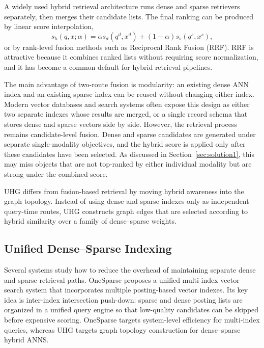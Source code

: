 A widely used hybrid retrieval architecture runs dense and sparse retrievers separately, then merges their candidate lists. The final ranking can be produced by linear score interpolation,
\begin{equation}
    s_h(q,x;\alpha)=\alpha s_d(q^d,x^d)+(1-\alpha)s_s(q^s,x^s),
\end{equation}
or by rank-level fusion methods such as Reciprocal Rank Fusion (RRF). RRF is attractive because it combines ranked lists without requiring score normalization, and it has become a common default for hybrid retrieval pipelines.

The main advantage of two-route fusion is modularity: an existing dense ANN index and an existing sparse index can be reused without changing either index. Modern vector databases and search systems often expose this design as either two separate indexes whose results are merged, or a single record schema that stores dense and sparse vectors side by side. However, the retrieval process remains candidate-level fusion. Dense and sparse candidates are generated under separate single-modality objectives, and the hybrid score is applied only after these candidates have been selected. As discussed in Section~\ref{sec:solution1}, this may miss objects that are not top-ranked by either individual modality but are strong under the combined score.

UHG differs from fusion-based retrieval by moving hybrid awareness into the graph topology. Instead of using dense and sparse indexes only as independent query-time routes, UHG constructs graph edges that are selected according to hybrid similarity over a family of dense--sparse weights.

\subsection{Unified Dense--Sparse Indexing}

Several systems study how to reduce the overhead of maintaining separate dense and sparse retrieval paths. OneSparse proposes a unified multi-index vector search system that incorporates multiple posting-based vector indexes. Its key idea is inter-index intersection push-down: sparse and dense posting lists are organized in a unified query engine so that low-quality candidates can be skipped before expensive scoring. OneSparse targets system-level efficiency for multi-index queries, whereas UHG targets graph topology construction for dense--sparse hybrid ANNS.

